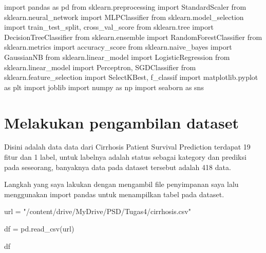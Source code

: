 \documentclass[
  letterpaper,
]{krantz}
\makeatletter
\newenvironment{Shaded}{\begin{snugshade}}{\end{snugshade}}
\newcommand{\ImportTok}[1]{\textcolor[rgb]{0.00,0.46,0.62}{#1}}
\newcommand{\NormalTok}[1]{\textcolor[rgb]{0.00,0.23,0.31}{#1}}
\newcommand{\OperatorTok}[1]{\textcolor[rgb]{0.37,0.37,0.37}{#1}}
\newcommand{\StringTok}[1]{\textcolor[rgb]{0.13,0.47,0.30}{#1}}
\newenvironment{kframe}{%
\medskip{}
\setlength{\fboxsep}{.8em}
 \def\at@end@of@kframe{}%
 \ifinner\ifhmode%
  \def\at@end@of@kframe{\end{minipage}}%
  \begin{minipage}{\columnwidth}%
 \fi\fi%
 \def\FrameCommand##1{\hskip\@totalleftmargin \hskip-\fboxsep
 \colorbox{shadecolor}{##1}\hskip-\fboxsep
     \hskip-\linewidth \hskip-\@totalleftmargin \hskip\columnwidth}%
 \MakeFramed {\advance\hsize-\width
   \@totalleftmargin\z@ \linewidth\hsize
   \@setminipage}}%
 {\par\unskip\endMakeFramed%
 \at@end@of@kframe}
\renewenvironment{Shaded}{\begin{kframe}}{\end{kframe}}
\makeatother
\begin{document}
\begin{Shaded}
\begin{Highlighting}[]
\ImportTok{import}\NormalTok{ pandas }\ImportTok{as}\NormalTok{ pd}
\ImportTok{from}\NormalTok{ sklearn.preprocessing }\ImportTok{import}\NormalTok{ StandardScaler}
\ImportTok{from}\NormalTok{ sklearn.neural\_network }\ImportTok{import}\NormalTok{ MLPClassifier}
\ImportTok{from}\NormalTok{ sklearn.model\_selection }\ImportTok{import}\NormalTok{ train\_test\_split, cross\_val\_score}
\ImportTok{from}\NormalTok{ sklearn.tree }\ImportTok{import}\NormalTok{ DecisionTreeClassifier}
\ImportTok{from}\NormalTok{ sklearn.ensemble }\ImportTok{import}\NormalTok{ RandomForestClassifier}
\ImportTok{from}\NormalTok{ sklearn.metrics }\ImportTok{import}\NormalTok{ accuracy\_score}
\ImportTok{from}\NormalTok{ sklearn.naive\_bayes }\ImportTok{import}\NormalTok{ GaussianNB}
\ImportTok{from}\NormalTok{ sklearn.linear\_model }\ImportTok{import}\NormalTok{ LogisticRegression}
\ImportTok{from}\NormalTok{ sklearn.linear\_model }\ImportTok{import}\NormalTok{ Perceptron, SGDClassifier}
\ImportTok{from}\NormalTok{ sklearn.feature\_selection }\ImportTok{import}\NormalTok{ SelectKBest, f\_classif}
\ImportTok{import}\NormalTok{ matplotlib.pyplot }\ImportTok{as}\NormalTok{ plt}
\ImportTok{import}\NormalTok{ joblib}
\ImportTok{import}\NormalTok{ numpy }\ImportTok{as}\NormalTok{ np}
\ImportTok{import}\NormalTok{ seaborn }\ImportTok{as}\NormalTok{ sns}
\end{Highlighting}
\end{Shaded}

\hypertarget{melakukan-pengambilan-dataset-1}{%
\section{Melakukan pengambilan
dataset}\label{melakukan-pengambilan-dataset-1}}

Disini adalah data data dari Cirrhosis Patient Survival Prediction
terdapat 19 fitur dan 1 label, untuk labelnya adalah status sebagai
kategory dan prediksi pada seseorang, banyaknya data pada dataset
tersebut adalah 418 data.

Langkah yang saya lakukan dengan mengambil file penyimpanan saya lalu
menggunakan import pandas untuk menampilkan tabel pada dataset.

\begin{Shaded}
\begin{Highlighting}[]

\NormalTok{url }\OperatorTok{=} \StringTok{"/content/drive/MyDrive/PSD/Tugas4/cirrhosis.csv"}


\NormalTok{df }\OperatorTok{=}\NormalTok{ pd.read\_csv(url)}

\NormalTok{df}

\end{Highlighting}
\end{Shaded}
\end{document}
